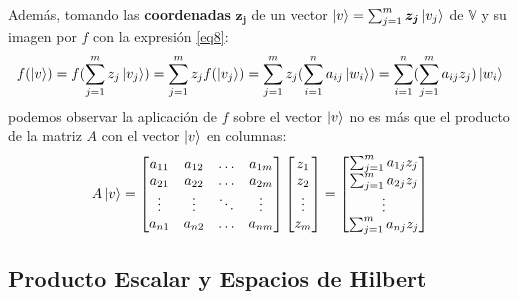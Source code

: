 \documentclass[a4paper]{article}
\numberwithin{equation}{section}
\begin{document}
Además, tomando las \textbf{coordenadas} $\boldsymbol{z_j}$ de un vector $\ket{v} = \sum_{j=1}^m \boldsymbol{z_j} \ket{v_j}$ de $\mathbb{V}$ y su imagen por $f$ con la expresión \ref{eq8}:
\begin{equation}
f(\ket{v}) = f(\sum_{j=1}^m z_j \ket{v_j}) = \sum_{j=1}^m z_j f(\ket{v_j}) = \sum_{j=1}^m z_j (\sum_{i=1}^n a_{ij} \ket{w_i}) = 
\sum_{i=1}^n (\sum_{j=1}^m a_{ij} z_{j}) \ket{w_i}
\end{equation}
podemos observar la aplicación de $f$ sobre el vector $\ket{v}$ no es más que el producto de la matriz $A$ con el vector $\ket{v}$ en columnas:
\begin{equation}
A\ket{v} = 
\begin{bmatrix}
a_{11} & a_{12} &\ldots & a_{1m} \\
a_{21} & a_{22} &\ldots & a_{2m} \\
\vdots & \vdots &\ddots & \vdots \\
a_{n1} & a_{n2} &\ldots & a_{nm}
\end{bmatrix}
\begin{bmatrix}
z_1 \\ z_2 \\ \vdots \\ z_m
\end{bmatrix} =
\begin{bmatrix}
\sum_{j=1}^m a_{1j}z_j \\
\sum_{j=1}^m a_{2j}z_j \\
\vdots \\
\sum_{j=1}^m a_{nj}z_j \\
\end{bmatrix}
\end{equation}

\subsection{Producto Escalar y Espacios de Hilbert}
\end{document}
